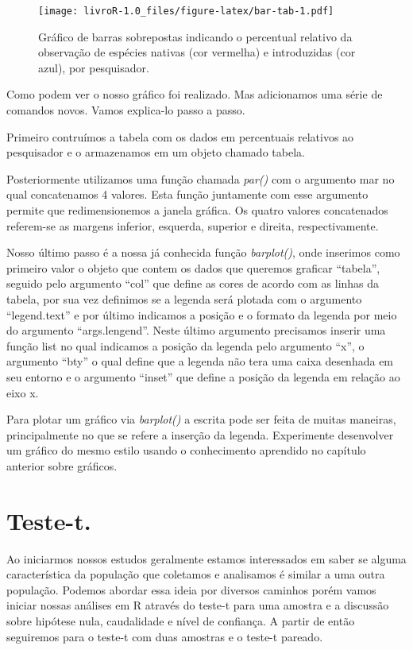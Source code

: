 \documentclass[]{book}
\begin{document}
\begin{figure}
\centering
\texttt{[image: livroR-1.0\_files/figure-latex/bar-tab-1.pdf]}
\caption{\label{fig:bar-tab}Gráfico de barras sobrepostas indicando o percentual relativo da observação de espécies nativas (cor vermelha) e introduzidas (cor azul), por pesquisador.}
\end{figure}

Como podem ver o nosso gráfico foi realizado. Mas adicionamos uma série de comandos novos. Vamos explica-lo passo a passo.

Primeiro contruímos a tabela com os dados em percentuais relativos ao pesquisador e o armazenamos em um objeto chamado tabela.

Posteriormente utilizamos uma função chamada \emph{par()} com o argumento mar no qual concatenamos 4 valores. Esta função juntamente com esse argumento permite que redimensionemos a janela gráfica. Os quatro valores concatenados referem-se as margens inferior, esquerda, superior e direita, respectivamente.

Nosso último passo é a nossa já conhecida função \emph{barplot()}, onde inserimos como primeiro valor o objeto que contem os dados que queremos graficar ``tabela'', seguido pelo argumento ``col'' que define as cores de acordo com as linhas da tabela, por sua vez definimos se a legenda será plotada com o argumento ``legend.text'' e por último indicamos a posição e o formato da legenda por meio do argumento ``args.lengend''. Neste último argumento precisamos inserir uma função list no qual indicamos a posição da legenda pelo argumento ``x'', o argumento ``bty'' o qual define que a legenda não tera uma caixa desenhada em seu entorno e o argumento ``inset'' que define a posição da legenda em relação ao eixo x.

Para plotar um gráfico via \emph{barplot()} a escrita pode ser feita de muitas maneiras, principalmente no que se refere a inserção da legenda. Experimente desenvolver um gráfico do mesmo estilo usando o conhecimento aprendido no capítulo anterior sobre gráficos.

\hypertarget{teste-t.}{%
\chapter{Teste-t.}\label{teste-t.}}

Ao iniciarmos nossos estudos geralmente estamos interessados em saber se alguma característica da população que coletamos e analisamos é similar a uma outra população. Podemos abordar essa ideia por diversos caminhos porém vamos iniciar nossas análises em R através do teste-t para uma amostra e a discussão sobre hipótese nula, caudalidade e nível de confiança. A partir de então seguiremos para o teste-t com duas amostras e o teste-t pareado.
\end{document}
